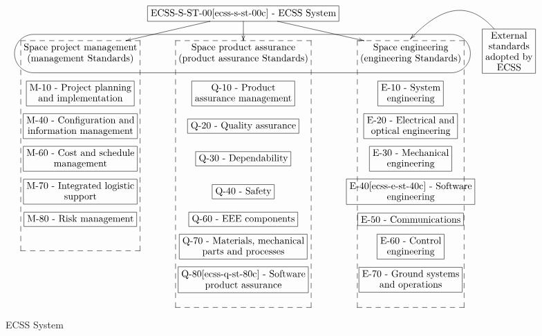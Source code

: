 {%
\else
\begin{figure}[!ht]
\footnotesize
\begin{displaymath}
\xymatrix@=.28cm{
  & *+[F-]{\txt{ECSS-S-ST-00\cite{ecss-s-st-00c} - ECSS System}} \ar@{->}[d] \ar@{->}[dl] \ar@{->}[dr] & \\
	\h\a{\txt{Space project management\\(management Standards)}}
  & \b{\txt{Space product assurance\\(product assurance Standards)}}
  & \b{\txt{Space engineering\\(engineering Standards)}} & *+[F]{\txt{External\\standards\\adopted by\\ECSS}}\ar@/{}_{3pc}/@{->}[];"h"+<3.1pt,28.3pt>+\\
	*+[F]{\txt{M-10 - Project planning\\and implementation}}
  & *+[F]{\txt{Q-10 - Product\\assurance management}}
  & *+[F]{\txt{E-10 - System\\engineering}}\\
	*+[F]{\txt{M-40 - Configuration and\\information management}}
  & *+[F]{\txt{Q-20 - Quality assurance}}
  & *+[F]{\txt{E-20 - Electrical and\\optical engineering}}\\
	*+[F]{\txt{M-60 - Cost and schedule\\management}}
  & *+[F]{\txt{Q-30 - Dependability}}
  & *+[F]{\txt{E-30 - Mechanical\\engineering}}\\
	*+[F]{\txt{M-70 - Integrated logistic\\support}}
  & *+[F]{\txt{Q-40 - Safety}}
  & *+[F]{\txt{E-40\cite{ecss-e-st-40c} - Software\\engineering}}\\
	*+[F]{\txt{M-80 - Risk management}}
  & *+[F]{\txt{Q-60 - EEE components}}
  & *+[F]{\txt{E-50 - Communications}}\\
  & *+[F]{\txt{Q-70 - Materials, mechanical\\parts and processes}}
  & *+[F]{\txt{E-60 - Control\\engineering}}\\
  & *+[F]{\txt{Q-80\cite{ecss-q-st-80c} - Software\\product assurance}}
  & *+[F]{\txt{E-70 - Ground systems\\and operations}}\\
  & & &
}
\end{displaymath}
    \caption{\protect\ac{ECSS} System}\label{fig:ecssdocsstruct}
\end{figure}
\fi

}
